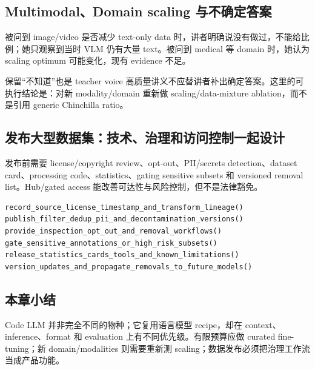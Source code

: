 
\subsection{Multimodal、Domain scaling 与不确定答案}

被问到 image/video 是否减少 text-only data 时，讲者明确说没有做过，不能给比例；她只观察到当时 VLM 仍有大量 text。被问到 medical 等 domain 时，她认为 scaling optimum 可能变化，现有 evidence 不足。

\begin{importantbox}{保留“不知道”也是 teacher voice}
高质量讲义不应替讲者补出确定答案。这里的可执行结论是：对新 modality/domain 重新做 scaling/data-mixture ablation，而不是引用 generic Chinchilla ratio。
\end{importantbox}


\subsection{发布大型数据集：技术、治理和访问控制一起设计}

发布前需要 license/copyright review、opt-out、PII/secrets detection、dataset card、processing code、statistics、gating sensitive subsets 和 versioned removal list。Hub/gated access 能改善可达性与风险控制，但不是法律豁免。

\begin{lstlisting}[caption={大型训练数据集发布前 checklist}]
record_source_license_timestamp_and_transform_lineage()
publish_filter_dedup_pii_and_decontamination_versions()
provide_inspection_opt_out_and_removal_workflows()
gate_sensitive_annotations_or_high_risk_subsets()
release_statistics_cards_tools_and_known_limitations()
version_updates_and_propagate_removals_to_future_models()
\end{lstlisting}


\subsection{本章小结}

Code LLM 并非完全不同的物种；它复用语言模型 recipe，却在 context、inference、format 和 evaluation 上有不同优先级。有限预算应做 curated fine-tuning；新 domain/modalities 则需要重新测 scaling；数据发布必须把治理工作流当成产品功能。


